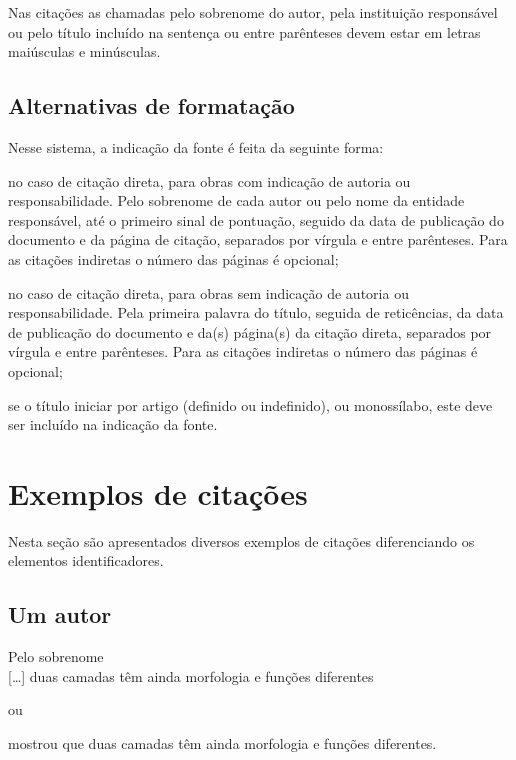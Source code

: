 Nas citações as chamadas pelo sobrenome do autor, pela instituição respons\'avel ou pelo título incluído na sentença ou entre par\^enteses devem estar em letras maiúsculas e minúsculas.

\subsection{Alternativas de formatação}
Nesse sistema, a indicação da fonte \'e feita da seguinte forma:

\begin{alineas}
	\item
	no caso de citação direta, para obras com indicação de autoria ou responsabilidade. Pelo sobrenome de cada autor ou pelo nome da entidade respons\'avel, at\'e o primeiro sinal de pontuação, seguido da data de publicação do documento e da p\'agina de citação, separados por vírgula e entre par\^enteses. Para as citações indiretas o número das p\'aginas \'e opcional;
	\item
	no caso de citação direta, para obras sem indicação de autoria ou responsabilidade. Pela primeira palavra do título, seguida de retic\^encias, da data de publicação do documento e da(s) p\'agina(s) da citação direta, separados por vírgula e entre par\^enteses. Para as citações indiretas o número das p\'aginas \'e opcional;
	\item
	se o título iniciar por artigo (definido ou indefinido), ou monossílabo, este deve ser incluído na indicação da fonte.
	
\end{alineas}
	
\section{Exemplos de citações}

Nesta seção são apresentados diversos exemplos de citações diferenciando os elementos identificadores. 

\subsection{Um autor}

Pelo sobrenome\\

[\ldots] duas camadas t\^em ainda morfologia e funções diferentes \cite{Pereira2013}

ou

 mostrou que duas camadas t\^em ainda morfologia e funções diferentes.\\


